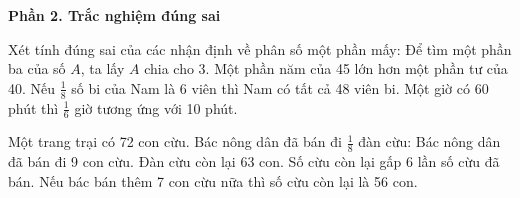 \textbf{Phần 2. Trắc nghiệm đúng sai}

\begin{ex} %
Xét tính đúng sai của các nhận định về phân số một phần mấy:
\choiceTF
{\True Để tìm một phần ba của số $A$, ta lấy $A$ chia cho 3.}
{Một phần năm của 45 lớn hơn một phần tư của 40.}
{\True Nếu $\frac{1}{8}$ số bi của Nam là 6 viên thì Nam có tất cả 48 viên bi.}
{\True Một giờ có 60 phút thì $\frac{1}{6}$ giờ tương ứng với 10 phút.}
\end{ex}

\begin{ex} %
Một trang trại có 72 con cừu. Bác nông dân đã bán đi $\frac{1}{8}$ đàn cừu:
\choiceTF
{\True Bác nông dân đã bán đi 9 con cừu.}
{\True Đàn cừu còn lại 63 con.}
{Số cừu còn lại gấp 6 lần số cừu đã bán.}
{\True Nếu bác bán thêm 7 con cừu nữa thì số cừu còn lại là 56 con.}
\end{ex}

